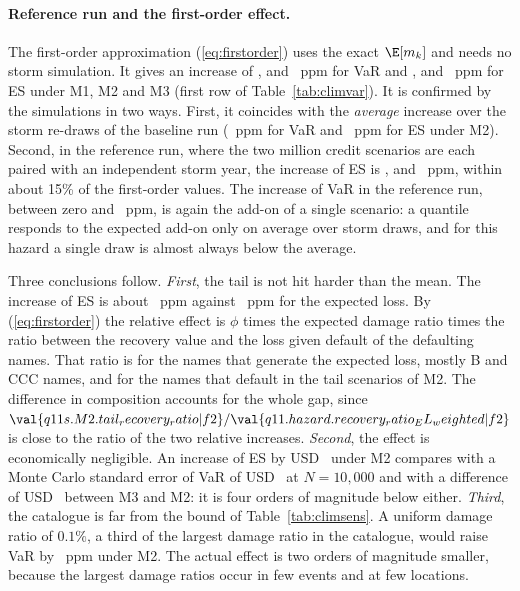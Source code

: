 \paragraph{Reference run and the first-order effect.}
The first-order approximation (\ref{eq:firstorder}) uses the exact $\E[m_k]$ and needs no storm simulation. It gives an increase of ,  and ~ppm for VaR and ,  and ~ppm for ES under M1, M2 and M3 (first row of Table~\ref{tab:climvar}). It is confirmed by the simulations in two ways. First, it coincides with the \emph{average} increase over the storm re-draws of the baseline run (~ppm for VaR and ~ppm for ES under M2). Second, in the reference run, where the two million credit scenarios are each paired with an independent storm year, the increase of ES is ,  and ~ppm, within about 15\% of the first-order values. The increase of VaR in the reference run, between zero and ~ppm, is again the add-on of a single scenario: a quantile responds to the expected add-on only on average over storm draws, and for this hazard a single draw is almost always below the average.

Three conclusions follow. \emph{First}, the tail is not hit harder than the mean. The increase of ES is about ~ppm against ~ppm for the expected loss. By (\ref{eq:firstorder}) the relative effect is $\phi$ times the expected damage ratio times the ratio between the recovery value and the loss given default of the defaulting names. That ratio is  for the names that generate the expected loss, mostly B and CCC names, and  for the names that default in the tail scenarios of M2. The difference in composition accounts for the whole gap, since $\val{q11s.M2.tail_recovery_ratio|f2}/\val{q11.hazard.recovery_ratio_EL_weighted|f2}$ is close to the ratio of the two relative increases. \emph{Second}, the effect is economically negligible. An increase of ES by USD~ under M2 compares with a Monte Carlo standard error of VaR of USD~ at $N=10{,}000$ and with a difference of USD~ between M3 and M2: it is four orders of magnitude below either. \emph{Third}, the catalogue is far from the bound of Table~\ref{tab:climsens}. A uniform damage ratio of $0.1\%$, a third of the largest damage ratio in the catalogue, would raise VaR by ~ppm under M2. The actual effect is two orders of magnitude smaller, because the largest damage ratios occur in few events and at few locations.

